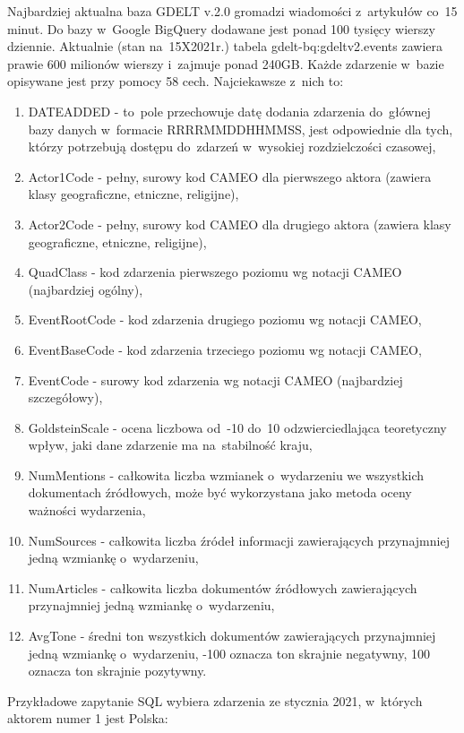 \documentclass[11pt]{report}
\begin{document}
    Najbardziej aktualna baza GDELT v.\@ 2.0 gromadzi wiadomości z~artykułów co~15 minut.
    Do bazy w~Google BigQuery dodawane jest ponad 100 tysięcy wierszy dziennie.
    Aktualnie (stan na~15X2021r.) tabela gdelt-bq:gdeltv2.events zawiera prawie 600 milionów wierszy
    i~zajmuje ponad 240GB\@.
    Każde zdarzenie w~bazie opisywane jest przy pomocy 58 cech.
    Najciekawsze z~nich to:
    \begin{enumerate}
        \item DATEADDED - to~pole przechowuje datę dodania zdarzenia do~głównej bazy danych w~formacie RRRRMMDDHHMMSS, jest odpowiednie dla tych, którzy potrzebują dostępu do~zdarzeń w~wysokiej rozdzielczości czasowej,
        \item Actor1Code - pełny, surowy kod CAMEO dla pierwszego aktora (zawiera klasy geograficzne, etniczne, religijne),
        \item Actor2Code - pełny, surowy kod CAMEO dla drugiego aktora (zawiera klasy geograficzne, etniczne, religijne),
        \item QuadClass - kod zdarzenia pierwszego poziomu wg notacji CAMEO (najbardziej ogólny),
        \item EventRootCode - kod zdarzenia drugiego poziomu wg notacji CAMEO,
        \item EventBaseCode - kod zdarzenia trzeciego poziomu wg notacji CAMEO,
        \item EventCode - surowy kod zdarzenia wg notacji CAMEO (najbardziej szczegółowy),
        \item GoldsteinScale - ocena liczbowa od~-10 do~10 odzwierciedlająca teoretyczny wpływ, jaki dane zdarzenie ma na~stabilność kraju,
        \item NumMentions - całkowita liczba wzmianek o~wydarzeniu we wszystkich dokumentach źródłowych,
        może być wykorzystana jako metoda oceny ważności wydarzenia,
        \item NumSources - całkowita liczba źródeł informacji zawierających przynajmniej jedną wzmiankę o~wydarzeniu,
        \item NumArticles - całkowita liczba dokumentów źródłowych zawierających przynajmniej jedną wzmiankę o~wydarzeniu,
        \item AvgTone - średni ton wszystkich dokumentów zawierających przynajmniej jedną wzmiankę o~wydarzeniu,
        -100 oznacza ton skrajnie negatywny, 100 oznacza ton skrajnie pozytywny.
    \end{enumerate}

    Przykładowe zapytanie SQL wybiera zdarzenia ze stycznia 2021, w~których aktorem numer 1 jest Polska:
\end{document}
